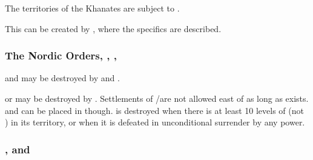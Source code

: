  The territories of the Khanates
are subject to .

 This \MIN can be created by
, where the specifics are described.

\subsubsection{The Nordic Orders, , , }
 \hfill {} 
\bparag {} and  may be destroyed by
 and .

 \hfill {} 
\bparag {} or  may be destroyed by
.
\label{chSpecific:Siberia} \hfill
{}
\bparag Settlements of \TP/\COL are not allowed east of
 as long as  exists. \TP and \COL
can be placed in  though.
\bparag {} is destroyed when there is at least 10 levels of
\COL (not \TP) in its territory, or when it is defeated in unconditional
surrender by any power.

\subsubsection{, 
  and }\label{chSpecific:Hungary}

